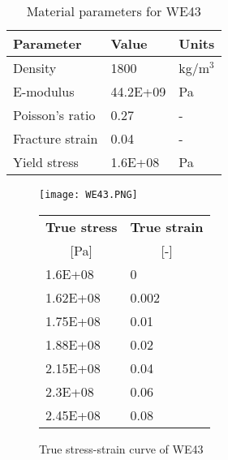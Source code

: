 \begin{table}[h]
\centering
\begin{tabular}{|l|l|l|}
\hline
\textbf{Parameter} & \textbf{Value} & \textbf{Units}  \\
\hline
Density            & 1800           & kg/m$^3$        \\
\hline
E-modulus          & 44.2E+09       & Pa              \\
\hline
Poisson's ratio    & 0.27           & -               \\
\hline
Fracture strain    & 0.04           & -               \\
\hline
Yield stress       & 1.6E+08        & Pa              \\
\hline
\end{tabular}
\caption{Material parameters for WE43}
\label{tab:WE43}
\end{table}

\begin{figure}
\begin{minipage}[t]{0.59\textwidth}
    \centering
    \texttt{[image: WE43.PNG]}
\end{minipage}
\begin{minipage}[t]{0.4\textwidth}
\vspace{-50mm}
\begin{tabular}{|l|l|}
\hline
\textbf{True stress} & \textbf{True strain} \\
\multicolumn{1}{|c|}{{[}Pa{]}} & \multicolumn{1}{c|}{{[}-{]}} \\\hline
1.6E+08                       & 0                            \\ \hline
1.62E+08                      & 0.002                        \\ \hline
1.75E+08                      & 0.01                         \\ \hline
1.88E+08                      & 0.02                         \\ \hline
2.15E+08                      & 0.04                         \\ \hline
2.3E+08                       & 0.06                         \\ \hline
2.45E+08                      & 0.08                         \\ \hline
\end{tabular}
\end{minipage}
\caption{True stress-strain curve of WE43 \cite{WE43}}
\label{fig:WE43}
\end{figure}

